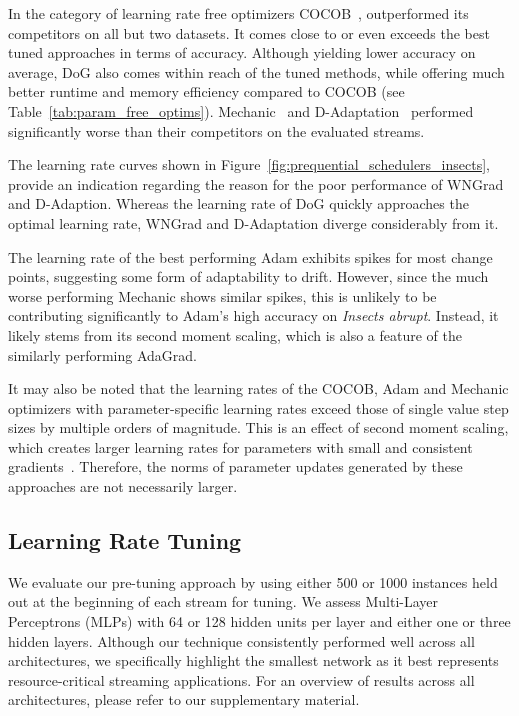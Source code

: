 \documentclass{article} %
\begin{document}
In the category of learning rate free optimizers COCOB~\citep{orabonaTrainingDeepNetworks2017}, outperformed its competitors on all but two datasets.
It comes close to or even exceeds the best tuned approaches in terms of accuracy.
Although yielding lower accuracy on average, DoG also comes within reach of the tuned methods, while offering much better runtime and memory efficiency compared to COCOB (see Table~\ref{tab:param_free_optims}).
Mechanic~\citep{cutkoskyMechanicLearningRate2023} and D-Adaptation~\citep{defazioLearningRateFreeLearningDAdaptation2023a} performed significantly worse than their competitors on the evaluated streams.

The learning rate curves shown in Figure~\ref{fig:prequential_schedulers_insects}, provide an indication regarding the reason for the poor performance of WNGrad and D-Adaption.
Whereas the learning rate of DoG quickly approaches the optimal learning rate, WNGrad and D-Adaptation diverge considerably from it.

The learning rate of the best performing Adam exhibits spikes for most change points, suggesting some form of adaptability to drift.
However, since the much worse performing Mechanic shows similar spikes, this is unlikely to be contributing significantly to Adam's high accuracy on \textit{Insects abrupt}.
Instead, it likely stems from its second moment scaling, which is also a feature of the similarly performing AdaGrad.

It may also be noted that the learning rates of the COCOB, Adam and Mechanic optimizers with parameter-specific learning rates exceed those of single value step sizes by multiple orders of magnitude.
This is an effect of second moment scaling, which creates larger learning rates for parameters with small and consistent gradients~\citep{cutkoskyMechanicLearningRate2023}.
Therefore, the norms of parameter updates generated by these approaches are not necessarily larger.


\subsection{Learning Rate Tuning}

We evaluate our pre-tuning approach by using either 500 or 1000 instances held out at the beginning of each stream for tuning. We assess Multi-Layer Perceptrons (MLPs) with 64 or 128 hidden units per layer and either one or three hidden layers.
Although our technique consistently performed well across all architectures, we specifically highlight the smallest network as it best represents resource-critical streaming applications. For an overview of results across all architectures, please refer to our supplementary material.
\end{document}
